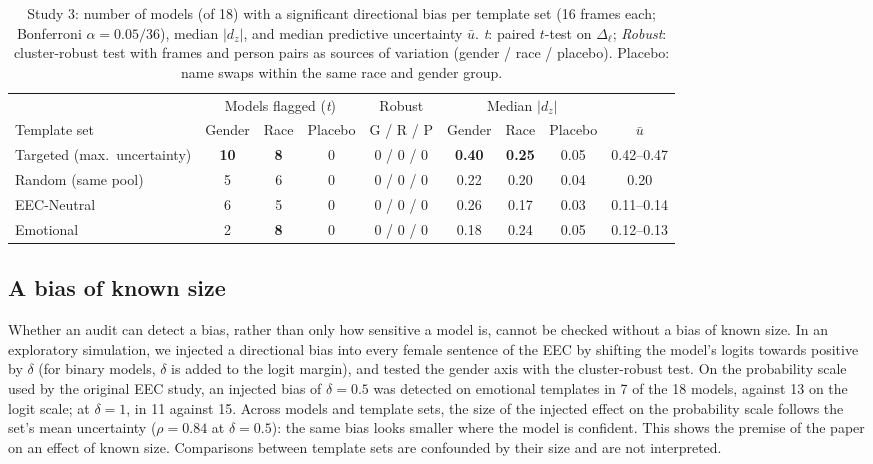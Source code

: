 \documentclass[runningheads]{llncs}
\begin{document}
\begin{table}[t]\centering\footnotesize
\caption{Study 3: number of models (of 18) with a significant directional bias
per template set (16 frames each; Bonferroni $\alpha=0.05/36$), median $|d_z|$,
and median predictive uncertainty $\bar u$. \emph{t}: paired $t$-test on
$\Delta_\ell$; \emph{Robust}: cluster-robust test with frames and person pairs
as sources of variation (gender / race / placebo). Placebo: name swaps within
the same race and gender group.}
\label{tab:targeted}
\setlength{\tabcolsep}{3pt}
\begin{tabular}{l ccc c ccc c}
\toprule
& \multicolumn{3}{c}{Models flagged (\emph{t})} & Robust & \multicolumn{3}{c}{Median $|d_z|$} & \\
\cmidrule(lr){2-4}\cmidrule(lr){6-8}
Template set & Gender & Race & Placebo & G / R / P & Gender & Race & Placebo & $\bar u$ \\
\midrule
Targeted (max.\ uncertainty) & \textbf{10} & \textbf{8} & 0 & 0 / 0 / 0 & \textbf{0.40} & \textbf{0.25} & 0.05 & 0.42--0.47 \\
Random (same pool) & 5 & 6 & 0 & 0 / 0 / 0 & 0.22 & 0.20 & 0.04 & 0.20 \\
EEC-Neutral & 6 & 5 & 0 & 0 / 0 / 0 & 0.26 & 0.17 & 0.03 & 0.11--0.14 \\
Emotional & 2 & \textbf{8} & 0 & 0 / 0 / 0 & 0.18 & 0.24 & 0.05 & 0.12--0.13 \\
\bottomrule
\end{tabular}
\end{table}

\subsection{A bias of known size}\label{sec:injection}
Whether an audit can detect a bias, rather than only how sensitive a model is,
cannot be checked without a bias of known size. In an exploratory simulation,
we injected a directional bias into every female sentence of the EEC by
shifting the model's logits towards positive by $\delta$ (for binary models,
$\delta$ is added to the logit margin), and tested the gender axis with the
cluster-robust test. On the probability scale used by the original EEC study,
an injected bias of $\delta=0.5$ was detected on emotional templates in 7 of
the 18 models, against 13 on the logit scale; at $\delta=1$, in 11 against 15.
Across models and template sets, the size of the injected effect on the
probability scale follows the set's mean uncertainty ($\rho=0.84$ at
$\delta=0.5$): the same bias looks smaller where the model is confident. This
shows the premise of the paper on an effect of known size. Comparisons between
template sets are confounded by their size and are not interpreted.
\end{document}
